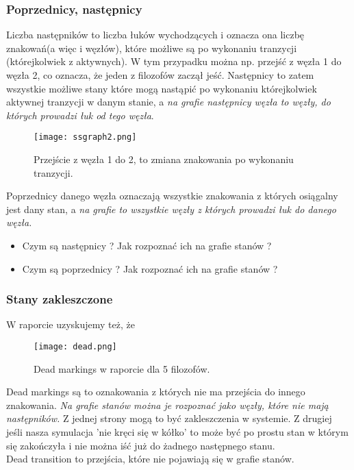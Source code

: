 \documentclass[a4paper,15pt]{article}
\begin{document}
\subsubsection{Poprzednicy, następnicy}
Liczba następników to liczba łuków wychodzących i oznacza ona liczbę znakowań(a więc i węzłów), które możliwe są po wykonaniu tranzycji (którejkolwiek z aktywnych). W tym przypadku można np. przejść z węzła 1 do węzła 2, co oznacza, że jeden z filozofów zaczął jeść. Następnicy to zatem wszystkie możliwe stany które mogą nastąpić po wykonaniu którejkolwiek aktywnej tranzycji w danym stanie, a \textit{na grafie następnicy węzła to węzły, do których prowadzi łuk od tego węzła}.
\begin{figure}[H]
\centerline{\texttt{[image: ssgraph2.png]}}
\caption{Przejście z węzła 1 do 2, to zmiana znakowania po wykonaniu tranzycji.}
\label{fig:sccgraph2}
\end{figure}
Poprzednicy danego węzła oznaczają wszystkie znakowania z których osiągalny jest dany stan, a \textit{na grafie to wszystkie węzły z których prowadzi łuk do danego węzła.}
\begin{framed}
\begin{itemize}
\item Czym są następnicy ? Jak rozpoznać ich na grafie stanów ?
\item Czym są poprzednicy ? Jak rozpoznać ich na grafie stanów ?
\end{itemize}
\end{framed}


\subsubsection{Stany zakleszczone}
W raporcie uzyskujemy też, że 
\begin{figure}[H]
\centerline{\texttt{[image: dead.png]}}
\caption{Dead markings w raporcie dla 5 filozofów.}
\label{fig:dead}
\end{figure}

Dead markings są to oznakowania z których nie ma przejścia do innego znakowania. \textit{Na grafie stanów można je rozpoznać jako węzły, które nie mają następników.} Z jednej strony mogą to być zakleszczenia w systemie. Z drugiej jeśli nasza symulacja 'nie kręci się w kółko' to może być po prostu stan w którym się zakończyła i nie można iść już do żadnego następnego stanu. \\
Dead transition to przejścia, które nie pojawiają się w grafie stanów.
\end{document}
